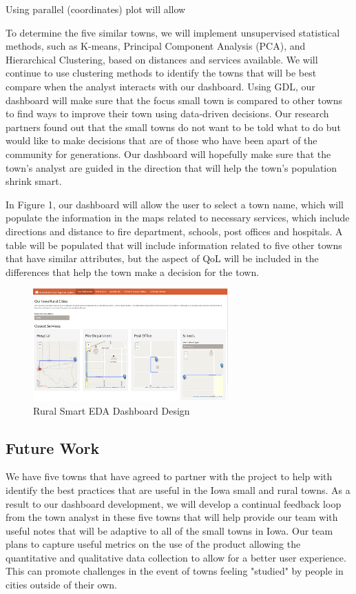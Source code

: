 \documentclass[10pt]{article}\usepackage[]{graphicx}\usepackage[]{color}
\begin{document}
Using parallel (coordinates) plot will allow 

To determine the five similar towns, we will implement unsupervised statistical methods, such as K-means, Principal Component Analysis (PCA), and Hierarchical Clustering, based on distances and services available. We will continue to use clustering methods to identify the towns that will be best compare when the analyst interacts with our dashboard. Using GDL,  our dashboard will make sure that the focus small town is compared to other towns to find ways to improve their town using data-driven decisions. Our research partners found out that the small towns do not want to be told what to do but would like to make decisions that are of those who have been apart of the community for generations. Our dashboard will hopefully make sure that the town's analyst are guided in the direction that will help the town's population shrink smart.

In Figure 1, our dashboard will allow the user to select a town name, which will populate the information in the maps related to necessary services, which include directions and distance to fire department, schools, post offices and hospitals. A table will be populated that will include information related to five other towns that have similar attributes, but the aspect of QoL will be included in the differences that help the town make a decision for the town. 

\begin{figure}[ht!]
\centering
\includegraphics[width=75mm]{SCC_Dashboard.png}
\caption{Rural Smart EDA Dashboard Design}
\end{figure}


\subsection{Future Work}
We have five towns that have agreed to partner with the project to help with identify the best practices that are useful in the Iowa small and rural towns. As a result to our dashboard development, we will develop a continual feedback loop from the town analyst in these five towns that will help provide our team with useful notes that will be adaptive to all of the small towns in Iowa. Our team plans to capture useful metrics on the use of the product allowing the quantitative and qualitative data collection to allow for a better user experience. This can promote challenges in the event of towns feeling "studied" by people in cities outside of their own. 
\end{document}
